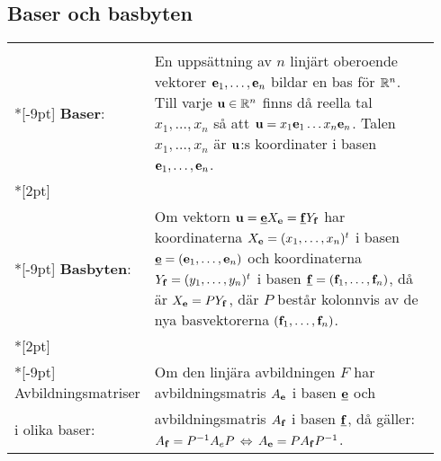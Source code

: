 \documentclass{article}
\begin{document}
\subsection*{Baser och basbyten}%
\begin{tabular}{|p{0.2\linewidth}|p{0.745\linewidth}|}
  \hline & \\*[-9pt]
  \textbf{Baser}:
  &
  En uppsättning av $n$ linjärt oberoende vektorer ${\mathbf e}_1,\dots,\mathbf e_n$ bildar en bas för ${\mathbb R}^n$. Till varje ${\mathbf u}\in{\mathbb R}^n$ finns
  då reella tal $x_1,\dots,x_n$ så att ${\mathbf u}=x_1{\mathbf e}_1\dots x_n\mathbf e_n$. Talen $x_1,\dots,x_n$ är ${\mathbf u}$:s koordinater i basen 
  ${\mathbf e}_1,\dots,{\mathbf e}_n$.
  \\*[2pt] \hline & \\*[-9pt]
  \textbf{Basbyten}:
  &
  Om vektorn ${\mathbf u}=\underline{{\mathbf e}}X_{\mathbf e} = \underline{{\mathbf f}}Y_{\mathbf f}$ har koordinaterna 
  $X_{\mathbf e}=(x_1,\dots,x_n)^t$ i basen 
  $\underline{{\mathbf e}}=({\mathbf e}_1,\dots,{\mathbf e}_n)$
  och koordinaterna 
  $Y_{{\mathbf f}}=(y_1,\dots,y_n)^t$ i basen 
  $\underline{{\mathbf f}}=({\mathbf f}_1,\dots,{\mathbf f}_n)$, 
  då är 
  $
  X_{\mathbf e} = P Y_{\mathbf f}
  $,
  där $P$ består kolonnvis av de nya basvektorerna 
  $({\mathbf f}_1,\dots,{\mathbf f}_n)$.
  \\*[2pt] \hline & \\*[-9pt]
  Avbildningsmatriser 
  &
  Om den linjära avbildningen $F$ har
  avbildningsmatris $A_{\mathbf e}$ i basen $\underline{{\mathbf e}}$ och
  \\
  i olika baser:
  &
  avbildningsmatris $A_{\mathbf f}$ i basen $\underline{{\mathbf f}}$, då gäller:
  $
  A_{\mathbf f}=P^{-1}A_eP\,\Leftrightarrow\, A_{\mathbf e} = PA_{\mathbf f} P^{-1}
  $.
  \\
  \hline
\end{tabular}%
\end{document}
